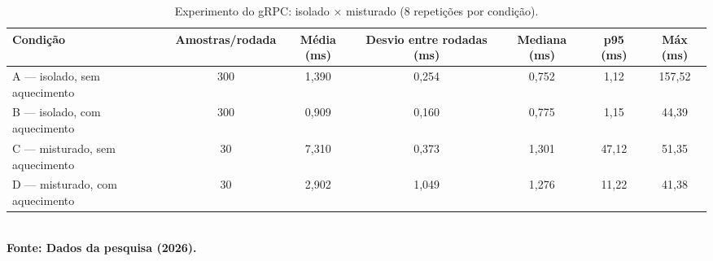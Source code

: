 \begin{table}[H]
\centering
\scriptsize
\caption{Experimento do gRPC: isolado × misturado (8 repetições por condição).}
\label{tab:grpc_variacao}
\begin{tabular}{|l|c|c|c|c|c|c|}
\hline
\textbf{Condição} & \textbf{Amostras/rodada} & \textbf{Média (ms)} & \textbf{Desvio entre rodadas (ms)} & \textbf{Mediana (ms)} & \textbf{p95 (ms)} & \textbf{Máx (ms)} \\ \hline
A — isolado, sem aquecimento & 300 & 1,390 & 0,254 & 0,752 & 1,12 & 157,52 \\ \hline
B — isolado, com aquecimento & 300 & 0,909 & 0,160 & 0,775 & 1,15 & 44,39 \\ \hline
C — misturado, sem aquecimento & 30 & 7,310 & 0,373 & 1,301 & 47,12 & 51,35 \\ \hline
D — misturado, com aquecimento & 30 & 2,902 & 1,049 & 1,276 & 11,22 & 41,38 \\ \hline
\end{tabular}
{\footnotesize\\ \textbf{Fonte: Dados da pesquisa (2026).}}
\end{table}
